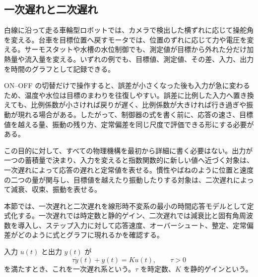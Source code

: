 \subsection{一次遅れと二次遅れ}

白線に沿って走る車輪型ロボットでは、カメラで検出した横ずれに応じて操舵角を変える。台車を目標位置へ戻すモータでは、位置のずれに応じて力や電圧を変える。サーモスタットや水槽の水位制御でも、測定値が目標から外れた分だけ加熱量や流入量を変える。いずれの例でも、目標値、測定値、その差、入力、出力を時間のグラフとして記録できる。

ON--OFF の切替だけで操作すると、誤差が小さくなった後も入力が急に変わるため、温度や水位は目標のまわりを往復しやすい。誤差に比例した入力へ置き換えても、比例係数が小さければ戻りが遅く、比例係数が大きければ行き過ぎや振動が現れる場合がある。したがって、制御器の式を書く前に、応答の速さ、目標値を越える量、振動の残り方、定常偏差を同じ尺度で評価できる形にする必要がある。

この目的に対して、すべての物理機構を最初から詳細に書く必要はない。出力が一つの蓄積量で決まり、入力を変えると指数関数的に新しい値へ近づく対象は、一次遅れによって応答の遅れと定常値を表せる。慣性やばねのように位置と速度の二つの量が関与し、目標値を越えたり振動したりする対象は、二次遅れによって減衰、収束、振動を表せる。

本節では、一次遅れと二次遅れを線形時不変系の最小の時間応答モデルとして定式化する。一次遅れでは時定数と静的ゲイン、二次遅れでは減衰比と固有角周波数を導入し、ステップ入力に対して応答速度、オーバーシュート、整定、定常偏差がどのように式とグラフに現れるかを確認する。

\begin{definition}[一次遅れ]
入力 $u(t)$ と出力 $y(t)$ が
\begin{equation}
  \tau\dot{y}(t)+y(t)=K u(t),\qquad \tau>0
  \label{eq:first-order}
\end{equation}
を満たすとき、これを一次遅れ系という。$\tau$ を時定数、$K$ を静的ゲインという。
\end{definition}

